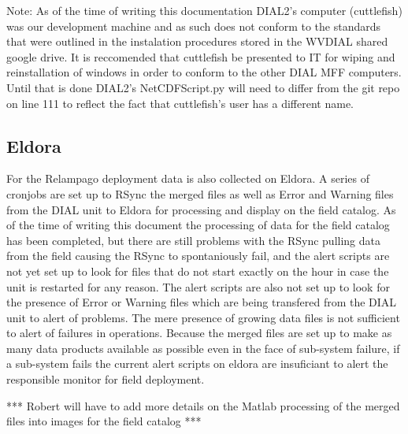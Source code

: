 Note: As of the time of writing this documentation DIAL2's computer (cuttlefish) was our development machine and as such does not conform to the standards that were outlined in the instalation procedures stored in the WVDIAL shared google drive. It is reccomended that cuttlefish be presented to IT for wiping and reinstallation of windows in order to conform to the other DIAL MFF computers. Until that is done DIAL2's NetCDFScript.py will need to differ from the git repo on line 111 to reflect the fact that cuttlefish's user has a different name. 

\subsection{Eldora}

For the Relampago deployment data is also collected on Eldora. A series of cronjobs are set up to RSync the merged files as well as Error and Warning files from the DIAL unit to Eldora for processing and display on the field catalog. As of the time of writing this document the processing of data for the field catalog has been completed, but there are still problems with the RSync pulling data from the field causing the RSync to spontaniously fail, and the alert scripts are not yet set up to look for files that do not start exactly on the hour in case the unit is restarted for any reason. The alert scripts are also not set up to look for the presence of Error or Warning files which are being transfered from the DIAL unit to alert of problems. The mere presence of growing data files is not sufficient to alert of failures in operations. Because the merged files are set up to make as many data products available as possible even in the face of sub-system failure, if a sub-system fails the current alert scripts on eldora are insuficiant to alert the responsible monitor for field deployment. 

*** Robert will have to add more details on the Matlab processing of the merged files into images for the field catalog *** 

\newpage
